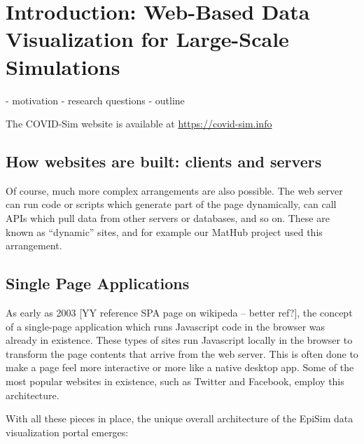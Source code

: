 \hypertarget{introduction-main}{%
\section{Introduction: Web-Based Data Visualization for Large-Scale Simulations}
\label{introduction-main}}

- motivation
- research questions
- outline




The COVID-Sim website is available at \url{https://covid-sim.info}

\hypertarget{how-websites-are-built-clients-and-servers}{%
\subsection{How websites are built: clients and
servers}\label{how-websites-are-built-clients-and-servers}}

Of course, much more complex arrangements are also possible. The web
server can run code or scripts which generate part of the page
dynamically, can call APIs which pull data from other servers or
databases, and so on. These are known as ``dynamic'' sites, and for
example our MatHub project used this arrangement.

\hypertarget{single-page-applications}{%
\subsection{Single Page Applications}\label{single-page-applications}}

As early as 2003 {[}YY reference SPA page on wikipeda -- better ref?{]},
the concept of a single-page application which runs Javascript code in
the browser was already in existence. These types of sites run
Javascript locally in the browser to transform the page contents that
arrive from the web server. This is often done to make a page feel more
interactive or more like a native desktop app. Some of the most popular
websites in existence, such as Twitter and Facebook, employ this
architecture.

With all these pieces in place, the unique overall architecture of the
EpiSim data visualization portal emerges:

